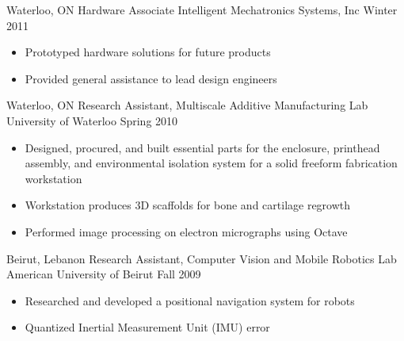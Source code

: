 \documentclass[10pt, letterpaper]{moderncv}
\begin{document}
    \begin{samepage}
      \cventry
          {Waterloo, ON}
          {Hardware Associate%
}
          {%
Intelligent Mechatronics Systems, Inc%
}
          {Winter 2011}
        {}
        {
            \begin{itemize}
                \item{Prototyped hardware solutions for future products}
                \item{Provided general assistance to lead design engineers}
            \end{itemize}
        }
    \end{samepage}
    \begin{samepage}
      \cventry
          {Waterloo, ON}
          {Research Assistant, %
	      Multiscale Additive Manufacturing Lab
}
          {%
University of Waterloo%
}
          {Spring 2010}
        {}
        {
            \begin{itemize}
                \item{Designed, procured, and built essential parts for the enclosure, printhead assembly, and environmental isolation system for a solid freeform fabrication workstation}
                \item{Workstation produces 3D scaffolds for bone and cartilage regrowth}
                \item{Performed image processing on electron micrographs using Octave}
            \end{itemize}
        }
    \end{samepage}
    \begin{samepage}
      \cventry
          {Beirut, Lebanon}
          {Research Assistant, %
	      Computer Vision and Mobile Robotics Lab
}
          {%
American University of Beirut%
}
          {Fall 2009}
        {}
        {
            \begin{itemize}
                \item{Researched and developed a positional navigation system for robots}
                \item{Quantized Inertial Measurement Unit (IMU) error}
            \end{itemize}
        }
    \end{samepage}
\end{document}

